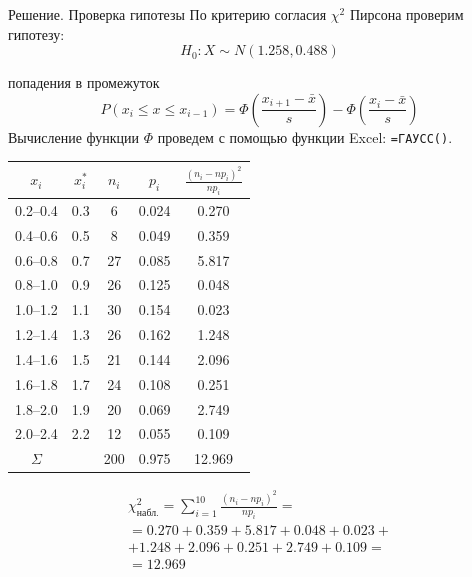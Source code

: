 \documentclass[unicode,11pt,notheorems,xcolor=table]{beamer}
\begin{document}
\begin{frame}[allowframebreaks]{Решение. Проверка гипотезы}
    По критерию согласия $\chi^2$ Пирсона проверим гипотезу:
    $$
        H_0\colon X \sim N(1.258,0.488)
    $$ 

     попадения в промежуток 
    $$
        P(x_i \leqslant x \leqslant x_{i-1})= \Phi \left(\frac{x_{i+1}-\bar{x}}{s}\right) - \Phi \left(\frac{x_{i}-\bar{x}}{s}\right)
    $$
    Вычисление функции $\Phi$ проведем с помощью функции Excel: \verb"=ГАУСС()".

    {\centering
        \begin{tabular}{ccccc}
            $x_i $     &$x^*_i$& $n_i$ & $p_i$ &  $\frac{(n_i-np_i)^2}{np_i}$ \\
            \hline
            0.2--0.4   & 0.3   & 6     & 0.024  & 0.270     \\  
            0.4--0.6   & 0.5   & 8     & 0.049  & 0.359     \\ 
            0.6--0.8   & 0.7   & 27    & 0.085  & 5.817     \\ 
            0.8--1.0   & 0.9   & 26    & 0.125  & 0.048     \\ 
            1.0--1.2   & 1.1   & 30    & 0.154  & 0.023     \\ 
            1.2--1.4   & 1.3   & 26    & 0.162  & 1.248     \\ 
            1.4--1.6   & 1.5   & 21    & 0.144  & 2.096     \\ 
            1.6--1.8   & 1.7   & 24    & 0.108  & 0.251     \\ 
            1.8--2.0   & 1.9   & 20    & 0.069  & 2.749    \\ 
            2.0--2.4   & 2.2   & 12    & 0.055  & 0.109    \\
            \hline
            $\Sigma$   &       & 200   & 0.975  & 12.969   \\
        \end{tabular}
    \par }
        

        \begin{multline*}
            \chi^2_\text{набл.} = \sum_{i=1}^{10} \frac{(n_i-np_i)^2}{np_i}  
            =\\
            = 0.270 +  0.359 +  5.817 +  0.048 +  0.023 
            +\\
            +  1.248 +  2.096 +  0.251 +  2.749 +  0.109 
            =\\
            = 12.969
       \end{multline*}


\end{frame}
\end{document}
